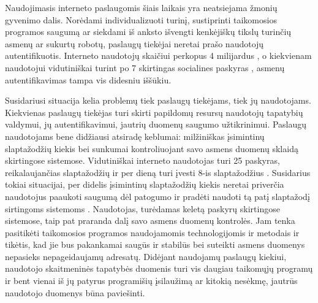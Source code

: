 Naudojimasis interneto paslaugomis šiais laikais yra neatsiejama žmonių gyvenimo dalis.
Norėdami individualizuoti turinį, sustiprinti taikomosios programos saugumą ar siekdami
iš anksto išvengti kenkėjiškų tikslų turinčių asmenų ar sukurtų robotų, paslaugų tiekėjai
neretai prašo naudotojų autentifikuotis. Interneto naudotojų skaičiui perkopus 4 milijardus \cite{InternetUsers2018},
o kiekvienam naudotojui vidutiniškai turint po 7 skirtingas socialines paskyras \cite{Mander2017}, asmenų
autentifikavimas tampa vis didesniu iššūkiu.

Susidariusi situacija kelia problemų tiek paslaugų tiekėjams, tiek jų naudotojams. Kiekvienas
paslaugų tiekėjas turi skirti papildomų resursų naudotojų tapatybių valdymui, jų autentifikavimui,
jautrių duomenų saugumo užtikrinimui. Paslaugų naudotojams bene didžiausi atsiradę keblumai:
milžiniškas įsimintinų slaptažodžių kiekis bei sunkumai kontroliuojant savo asmens duomenų sklaidą
skirtingose sistemose. Vidutiniškai interneto naudotojas turi 25 paskyras, reikalaujančias slaptažodžių
ir per dieną turi įvesti 8-is slaptažodžius \cite{Florencio2007}. Susidarius tokiai situacijai, per didelis įsimintinų slaptažodžių kiekis neretai 
priverčia naudotojus paaukoti saugumą dėl patogumo
ir pradėti naudoti tą patį slaptažodį sirtingoms sistemoms \cite{Pashalidis2003, Samar1999}. Naudotojas, turėdamas keletą
paskyrų skirtingose sistemose, taip pat praranda dalį savo asmens duomenų kontrolės. Jam tenka pasitikėti
taikomosios programos naudojamomis technologijomis ir metodais ir tikėtis, kad jie bus pakankamai saugūs
ir stabilūs bei suteikti asmens duomenys nepasieks nepageidaujamų adresatų. Didėjant naudojamų paslaugų kiekiui,
naudotojo skaitmeninės tapatybės duomenis turi vis daugiau taikomųjų programų ir bent vienai iš jų
patyrus programišių įsilaužimą ar kitokią nesėkmę, jautrūs naudotojo duomenys būna paviešinti. 

